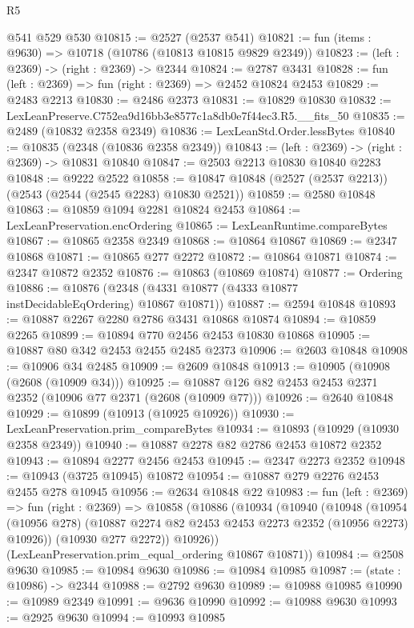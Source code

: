 \begin{lexlean}{R5}
\begin{coremodule}
    @541
    @529
    @530
@10815 := @2527 (@2537 @541)
@10821 := fun (items : @9630) => @10718 (@10786 (@10813 @10815 @9829 @2349))
@10823 := (left : @2369) -> (right : @2369) -> @2344
@10824 := @2787 @3431
@10828 := fun (left : @2369) => fun (right : @2369) => @2452 @10824 @2453
@10829 := @2483 @2213
@10830 := @2486 @2373
@10831 := @10829 @10830
@10832 := LexLeanPreserve.C752ea9d16bb3e8577c1a8db0e7f44ec3.R5.__fits_50
@10835 := @2489 (@10832 @2358 @2349)
@10836 := LexLeanStd.Order.lessBytes
@10840 := @10835 (@2348 (@10836 @2358 @2349))
@10843 := (left : @2369) -> (right : @2369) -> @10831 @10840
@10847 := @2503 @2213 @10830 @10840 @2283
@10848 := @9222 @2522
@10858 := @10847 @10848 (@2527 (@2537 @2213)) (@2543 (@2544 (@2545 @2283) @10830 @2521))
@10859 := @2580 @10848
@10863 := @10859 @1094 @2281 @10824 @2453
@10864 := LexLeanPreservation.encOrdering
@10865 := LexLeanRuntime.compareBytes
@10867 := @10865 @2358 @2349
@10868 := @10864 @10867
@10869 := @2347 @10868
@10871 := @10865 @277 @2272
@10872 := @10864 @10871
@10874 := @2347 @10872 @2352
@10876 := @10863 (@10869 @10874)
@10877 := Ordering
@10886 := @10876 (@2348 (@4331 @10877 (@4333 @10877 instDecidableEqOrdering) @10867 @10871))
@10887 := @2594 @10848
@10893 := @10887 @2267 @2280 @2786 @3431 @10868 @10874
@10894 := @10859 @2265
@10899 := @10894 @770 @2456 @2453 @10830 @10868
@10905 := @10887 @80 @342 @2453 @2455 @2485 @2373
@10906 := @2603 @10848
@10908 := @10906 @34 @2485
@10909 := @2609 @10848
@10913 := @10905 (@10908 (@2608 (@10909 @34)))
@10925 := @10887 @126 @82 @2453 @2453 @2371 @2352 (@10906 @77 @2371 (@2608 (@10909 @77)))
@10926 := @2640 @10848
@10929 := @10899 (@10913 (@10925 @10926))
@10930 := LexLeanPreservation.prim_compareBytes
@10934 := @10893 (@10929 (@10930 @2358 @2349))
@10940 := @10887 @2278 @82 @2786 @2453 @10872 @2352
@10943 := @10894 @2277 @2456 @2453
@10945 := @2347 @2273 @2352
@10948 := @10943 (@3725 @10945) @10872
@10954 := @10887 @279 @2276 @2453 @2455 @278 @10945
@10956 := @2634 @10848 @22
@10983 := fun (left : @2369) =>
  fun (right : @2369) =>
  @10858
    (@10886
      (@10934
        (@10940
          (@10948
            (@10954 (@10956 @278) (@10887 @2274 @82 @2453 @2453 @2273 @2352 (@10956 @2273) @10926))
            (@10930 @277 @2272))
          @10926))
      (LexLeanPreservation.prim_equal_ordering @10867 @10871))
@10984 := @2508 @9630
@10985 := @10984 @9630
@10986 := @10984 @10985
@10987 := (state : @10986) -> @2344
@10988 := @2792 @9630
@10989 := @10988 @10985
@10990 := @10989 @2349
@10991 := @9636 @10990
@10992 := @10988 @9630
@10993 := @2925 @9630
@10994 := @10993 @10985

\end{coremodule}
\end{lexlean}
